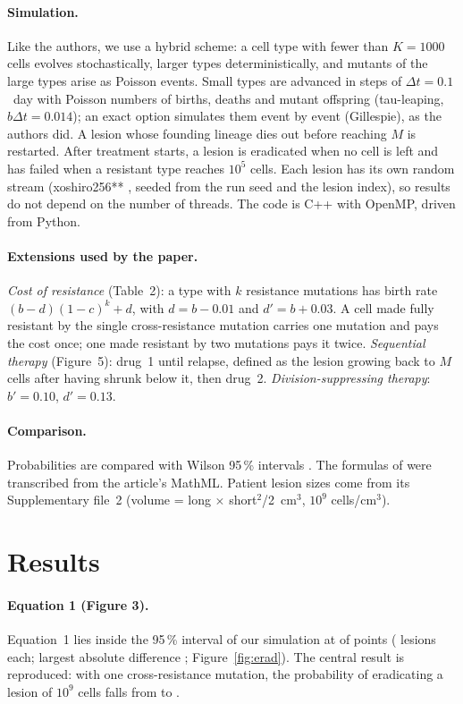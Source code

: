 \paragraph{Simulation.} Like the authors, we use a hybrid scheme: a cell type with fewer than
$K=1000$ cells evolves stochastically, larger types deterministically, and mutants of the
large types arise as Poisson events. Small types are advanced in steps of $\Delta t=0.1$~day
with Poisson numbers of births, deaths and mutant offspring (tau-leaping, $b\Delta t=0.014$);
an exact option simulates them event by event (Gillespie), as the authors did. A lesion whose
founding lineage dies out before reaching $M$ is restarted. After treatment starts, a lesion
is eradicated when no cell is left and has failed when a resistant type reaches $10^5$ cells.
Each lesion has its own random stream (xoshiro256** \cite{blackman2021}, seeded from the run
seed and the lesion index), so results do not depend on the number of threads. The code is
C++ with OpenMP, driven from Python.

\paragraph{Extensions used by the paper.} \emph{Cost of resistance} (Table~2): a type with $k$
resistance mutations has birth rate $(b-d)(1-c)^k+d$, with $d=b-0.01$ and $d'=b+0.03$. A cell
made fully resistant by the single cross-resistance mutation carries one mutation and pays the
cost once; one made resistant by two mutations pays it twice. \emph{Sequential therapy}
(Figure~5): drug~1 until relapse, defined as the lesion growing back to $M$ cells after having
shrunk below it, then drug~2. \emph{Division-suppressing therapy}: $b'=0.10$, $d'=0.13$.

\paragraph{Comparison.} Probabilities are compared with Wilson 95\,\% intervals
\cite{wilson1927}. The formulas of \cite{bozic2013} were transcribed from the article's
MathML. Patient lesion sizes come from its Supplementary file~2 (volume = long $\times$
short$^2$/2~cm$^3$, $10^9$ cells/cm$^3$).

\section*{Results}

\paragraph{Equation 1 (Figure 3).} Equation~1 lies inside the 95\,\% interval of our
simulation at \BozicInside{} of \BozicPoints{} points (\BozicLesions{} lesions each; largest
absolute difference \BozicMaxDiff{}; Figure~\ref{fig:erad}). The central result is
reproduced: with one cross-resistance mutation, the probability of eradicating a lesion of
$10^9$ cells falls from \BozicNoCross{} to \BozicOneCross{}.

